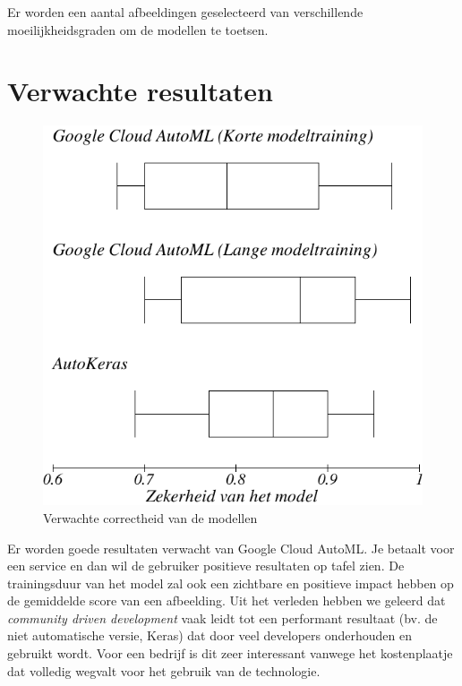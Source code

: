 Er worden een aantal afbeeldingen geselecteerd van verschillende moeilijkheidsgraden om de modellen te toetsen.

\section{Verwachte resultaten}
\label{sec:verwachte_resultaten}

\begin{figure}
    \includegraphics[width=\linewidth]{img/boxplot.png}
    \vspace{1mm}
    \caption{Verwachte correctheid van de modellen}
    \label{fig:boxplot1}
\end{figure}

Er worden goede resultaten verwacht van Google Cloud AutoML. Je betaalt voor een service en dan wil de gebruiker positieve resultaten op tafel zien. De trainingsduur van het model zal ook een zichtbare en positieve impact hebben op de gemiddelde score van een afbeelding. Uit het verleden hebben we geleerd dat \emph{community driven development} vaak leidt tot een performant resultaat (bv. de niet automatische versie, Keras) dat door veel developers onderhouden en gebruikt wordt. Voor een bedrijf is dit zeer interessant vanwege het kostenplaatje dat volledig wegvalt voor het gebruik van de technologie. 

